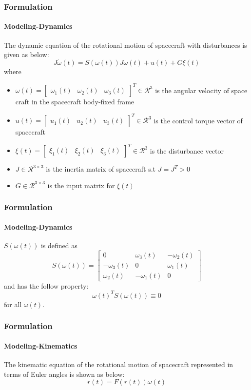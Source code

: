 \documentclass{beamer}
\begin{document}
\begin{frame}
\frametitle{Formulation}
\framesubtitle{Modeling-Dynamics}
The dynamic equation of the rotational motion of spacecraft with disturbances is given as below:
\begin{equation} \label{Dynamics}
J{\dot{\omega}(t)}=S(\omega(t))J\omega(t)+u(t)+G\xi(t)
\end{equation}
where
\begin{itemize}
	\item $\omega(t)=\begin{bmatrix}
	\omega_{1}(t)&\omega_{2}(t)&\omega_{3}(t)
	\end{bmatrix}^{T} \in \mathcal{R}^{3}$ is the angular velocity of space craft in the spacecraft body-fixed frame
	\item $u(t)=\begin{bmatrix}
	u_{1}(t)&u_{2}(t)&u_{3}(t)
	\end{bmatrix}^T \in \mathcal{R}^{3}$ is the control torque vector of spacecraft
	\item $\xi(t)=\begin{bmatrix}
	\xi_{1}(t)&\xi_{2}(t)&\xi_{3}(t)
	\end{bmatrix}^T \in \mathcal{R}^{3}$ is the disturbance vector
	\item $J \in \mathcal{R}^{3\times3}$ is the inertia matrix of spacecraft s.t $J=J^{T}>0$
	\item $G \in \mathcal{R}^{3\times3}$ is the input matrix for $\xi(t)$
\end{itemize}
\end{frame}

\begin{frame}
\frametitle{Formulation}
\framesubtitle{Modeling-Dynamics}
$S(\omega(t))$ is defined as
\begin{equation}
S(\omega(t))=\begin{bmatrix}
0&\omega_{3}(t)&-\omega_{2}(t)\\
-\omega_{3}(t)&0&\omega_{1}(t)\\
\omega_{2}(t)&-\omega_{1}(t)&0
\end{bmatrix}
\end{equation}
and has the follow property:
\begin{equation}\label{sProperty}
\omega(t)^TS(\omega(t))\equiv 0
\end{equation}
for all $\omega(t)$.
\end{frame}

\begin{frame}
\frametitle{Formulation}
\framesubtitle{Modeling-Kinematics}
The kinematic equation of the rotational motion of spacecraft represented in terms of Euler angles is shown as below:
\begin{equation} \label{Kinematics}
\dot{r}(t)=F(r(t))\omega(t)
\end{equation}
\end{frame}
\end{document}
